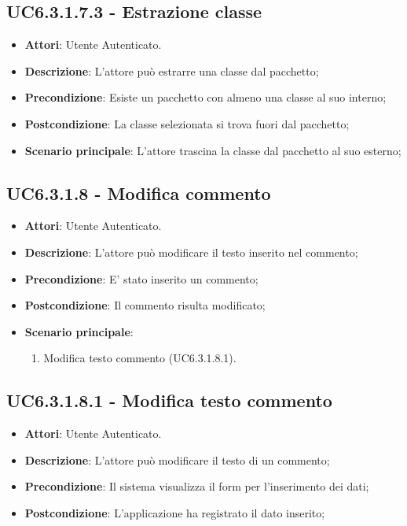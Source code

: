 \subsection{UC6.3.1.7.3 - Estrazione classe} 
\label{ssec:UC6.3.1.7.3} 
\begin{itemize} 
\item \textbf{Attori}: Utente Autenticato.
\item \textbf{Descrizione}: L'attore può estrarre una classe dal pacchetto;
\item \textbf{Precondizione}: Esiste un pacchetto con almeno una classe al suo interno;
\item \textbf{Postcondizione}: La classe selezionata si trova fuori dal pacchetto;
\item \textbf{Scenario principale}: L'attore trascina la classe dal pacchetto al suo esterno;\end{itemize} 
\subsection{UC6.3.1.8 - Modifica commento} 
\label{ssec:UC6.3.1.8} 
\begin{itemize} 
\item \textbf{Attori}: Utente Autenticato.
\item \textbf{Descrizione}: L'attore può modificare il testo inserito nel commento;
\item \textbf{Precondizione}: E' stato inserito un commento;
\item \textbf{Postcondizione}: Il commento risulta modificato;
\item \textbf{Scenario principale}: \begin{enumerate}\item Modifica testo commento (UC6.3.1.8.1). 
 \end{enumerate}
\end{itemize} 
\subsection{UC6.3.1.8.1 - Modifica testo commento} 
\label{ssec:UC6.3.1.8.1} 
\begin{itemize} 
\item \textbf{Attori}: Utente Autenticato.
\item \textbf{Descrizione}: L'attore può modificare il testo di un commento;
\item \textbf{Precondizione}: Il sistema visualizza il form per l'inserimento dei dati;
\item \textbf{Postcondizione}: L'applicazione ha registrato il dato inserito;
\end{itemize} 
